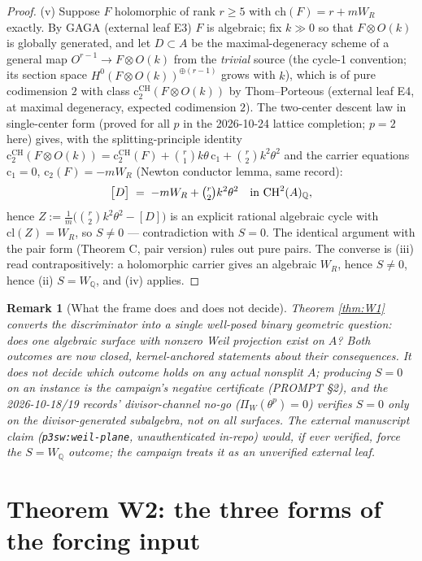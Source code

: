 \documentclass[11pt]{article}
\newtheorem{remark}{Remark}
\begin{document}
\begin{proof}
(v) Suppose $F$ holomorphic of rank $r\ge5$ with $\mathrm{ch}(F)=r+mW_R$ exactly. By GAGA (external leaf E3) $F$ is
algebraic; fix $k\gg0$ so that $F\otimes O(k)$ is globally generated, and let $D\subset A$ be the
maximal-degeneracy scheme of a general map $O^{r-1}\to F\otimes O(k)$ from the \emph{trivial} source
(the cycle-1 convention; its section space $H^0(F\otimes O(k))^{\oplus(r-1)}$ grows with $k$), which is of pure
codimension $2$ with class $\mathrm{c}_2^{\mathrm{CH}}(F\otimes O(k))$ by Thom--Porteous (external leaf E4, at maximal
degeneracy, expected codimension $2$). The two-center descent law in single-center form (proved for all $p$ in the
2026-10-24 lattice completion; $p=2$ here) gives, with the splitting-principle identity
$\mathrm{c}_2^{\mathrm{CH}}(F\otimes O(k))=\mathrm{c}_2^{\mathrm{CH}}(F)+\binom{r}{1}k\theta\,\mathrm{c}_1+\binom{r}{2}k^2\theta^2$
and the carrier equations $\mathrm{c}_1=0$, $\mathrm{c}_2(F)=-mW_R$ (Newton conductor lemma, same record):
\[
\big[D\big]\;=\;-mW_R+\tbinom{r}{2}k^{2}\theta^{2}\quad\text{in }\mathrm{CH}^{2}(A)_{\mathbb{Q}},
\]
hence $Z:=\tfrac1m\big(\binom{r}{2}k^{2}\theta^{2}-[D]\big)$ is an explicit rational algebraic cycle with
$\mathrm{cl}(Z)=W_R$, so $S\ne0$ --- contradiction with $S=0$. The identical argument with the pair form
(Theorem C, pair version) rules out pure pairs. The converse is (iii) read contrapositively: a holomorphic carrier
gives an algebraic $W_R$, hence $S\ne0$, hence (ii) $S=W_{\mathbb{Q}}$, and (iv) applies.
\end{proof}

\begin{remark}[What the frame does and does not decide]
Theorem \ref{thm:W1} converts the discriminator into a single well-posed binary geometric question:
does one algebraic surface with nonzero Weil projection exist on $A$? Both outcomes are now closed, kernel-anchored
statements about their consequences. It does not decide which outcome holds on any actual nonsplit $A$; producing
$S=0$ on an instance is the campaign's negative certificate (PROMPT \S2), and the 2026-10-18/19 records'
divisor-channel no-go ($\Pi_W(\theta^p)=0$) verifies $S=0$ only on the divisor-generated subalgebra, not on all
surfaces. The external manuscript claim (\texttt{p3sw:weil-plane}, unauthenticated in-repo) would, if ever verified,
force the $S=W_{\mathbb{Q}}$ outcome; the campaign treats it as an unverified external leaf.
\end{remark}

\section{Theorem W2: the three forms of the forcing input}\label{sec:W2}
\end{document}

